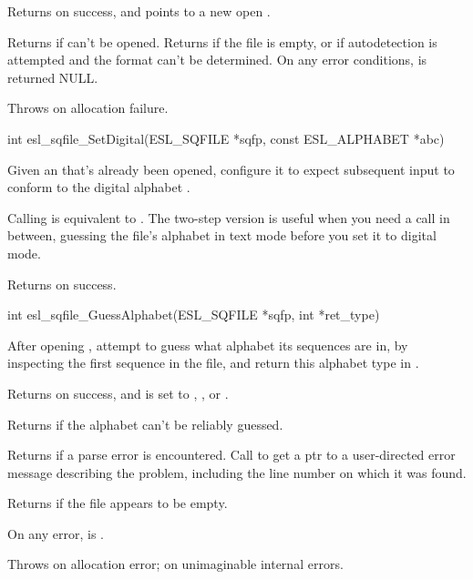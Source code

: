 \begin{sreapi}
Returns  on success, and  points to a new
open .

Returns  if  can't be opened.
Returns  if the file is empty, or if
autodetection is attempted and the format can't be
determined.  On any error conditions,  is
returned NULL.

Throws  on allocation failure.


\hypertarget{func:esl_sqfile_SetDigital()}
{\item[int esl\_sqfile\_SetDigital(ESL\_SQFILE *sqfp, const ESL\_ALPHABET *abc)]}

Given an  that's already been opened,
configure it to expect subsequent input to conform
to the digital alphabet .

Calling  is
equivalent to . The two-step
version is useful when you need a
 call in between, guessing
the file's alphabet in text mode before you set it to
digital mode.

Returns  on success.


\hypertarget{func:esl_sqfile_GuessAlphabet()}
{\item[int esl\_sqfile\_GuessAlphabet(ESL\_SQFILE *sqfp, int *ret\_type)]}

After opening , attempt to guess what alphabet
its sequences are in, by inspecting the first sequence
in the file, and return this alphabet type in .

Returns  on success, and  is set to ,
, or .

Returns  if the alphabet can't be
reliably guessed.

Returns  if a parse error is encountered.
Call  to get a ptr to a
user-directed error message describing the problem,
including the line number on which it was found.

Returns  if the file appears to be empty.

On any error,  is .

Throws  on allocation error;
 on unimaginable internal errors.



\end{sreapi}
